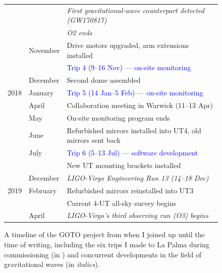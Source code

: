 \begin{colsection}
\begin{figure}[p]
\begin{center}
\begin{tabular}{cl|@{\tls}l}
                 &           & \textit{First gravitational-wave counterpart detected (GW170817)} \\
                 &           & \textit{O2 ends} \\
                 & November  & Drive motors upgraded, arm extensions installed \\
                 &           & \textcolor{Blue}{Trip 4 (9--16 Nov) --- on-site monitoring} \\
                 & December  & Second dome assembled \\
            \midrule
            2018 & January   & \textcolor{Blue}{Trip 5 (14 Jan--5 Feb) --- on-site monitoring} \\
                 & April     & Collaboration meeting in Warwick (11--13 Apr)\\
                 & May       & On-site monitoring program ends \\
                 & June      & Refurbished mirrors installed into UT4, old mirrors sent back \\
                 & July      & \textcolor{Blue}{Trip 6 (5--13 Jul) --- software development} \\
                 &           & New UT mounting brackets installed \\
                 & December  & \textit{LIGO-Virgo Engineering Run 13 (14--18 Dec)} \\
            \midrule
            2019 & February  & Refurbished mirrors reinstalled into UT3 \\
                 &           & Current 4-UT all-sky survey begins \\
                 & April     & \textit{LIGO-Virgo's third observing run (O3) begins} \\
        \end{tabular}
    \end{center}
    \caption[Timeline of the GOTO project]{
        A timeline of the GOTO project from when I joined up until the time of writing, including the six trips I made to La Palma during commissioning (in ) and concurrent developments in the field of gravitational waves (in \textit{italics}).
    }\label{tab:timeline}
\end{figure}

\clearpage


\end{colsection}
